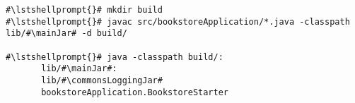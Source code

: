 \begin{lstlisting}[caption=Commands to compile and run the instrumented Bookstore under \UnixLikeSystems{},label=lst:bookstoreStarterLinux]
#\lstshellprompt{}# mkdir build
#\lstshellprompt{}# javac src/bookstoreApplication/*.java -classpath lib/#\mainJar# -d build/

#\lstshellprompt{}# java -classpath build/:
       lib/#\mainJar#:
       lib/#\commonsLoggingJar#
       bookstoreApplication.BookstoreStarter 
\end{lstlisting}
